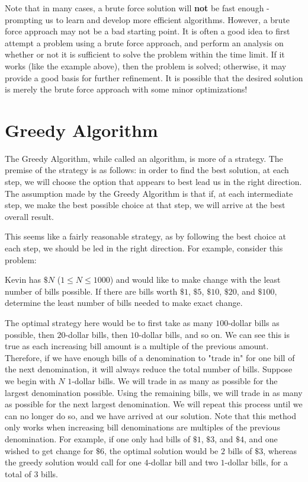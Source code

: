 Note that in many cases, a brute force solution will \textbf{not} be fast enough - prompting us to learn and develop more efficient algorithms.  However, a brute force approach may not be a bad starting point.  It is often a good idea to first attempt a problem using a brute force approach, and perform an analysis on whether or not it is sufficient to solve the problem within the time limit.  If it works (like the example above), then the problem is solved; otherwise, it may provide a good basis for further refinement.  It is possible that the desired solution is merely the brute force approach with some minor optimizations!

\section{Greedy Algorithm}

The Greedy Algorithm, while called an algorithm, is more of a strategy.  The premise of the strategy is as follows: in order to find the best solution, at each step, we will choose the option that appears to best lead us in the right direction.  The assumption made by the Greedy Algorithm is that if, at each intermediate step, we make the best possible choice at that step, we will arrive at the best overall result.

This seems like a fairly reasonable strategy, as by following the best choice at each step, we should be led in the right direction.  For example, consider this problem:

\begin{Problem}
Kevin has $ \$N $ ($ 1 \leq N \leq 1000 $) and would like to make change with the least number of bills possible.  If there are bills worth $ \$1 $, $ \$5 $, $ \$10 $, $ \$20 $, and $ \$100 $, determine the least number of bills needed to make exact change.
\end{Problem}

The optimal strategy here would be to first take as many $ 100 $-dollar bills as possible, then $ 20 $-dollar bills, then $ 10 $-dollar bills, and so on.  We can see this is true as each increasing bill amount is a multiple of the previous amount.  Therefore, if we have enough bills of a denomination to "trade in" for one bill of the next denomination, it will always reduce the total number of bills.  Suppose we begin with $ N $ $ 1 $-dollar bills.  We will trade in as many as possible for the largest denomination possible.  Using the remaining bills, we will trade in as many as possible for the next largest denomination.  We will repeat this process until we can no longer do so, and we have arrived at our solution.  Note that this method only works when increasing bill denominations are multiples of the previous denomination.  For example, if one only had bills of $ \$1 $, $ \$3 $, and $ \$ 4 $, and one wished to get change for $ \$6 $, the optimal solution would be $ 2 $ bills of $ \$3 $, whereas the greedy solution would call for one $ 4 $-dollar bill and two $ 1 $-dollar bills, for a total of $ 3 $ bills.

